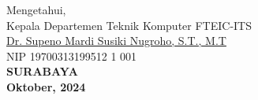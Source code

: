 \vspace{\fill}

\begin{center}
  Mengetahui,\\
  Kepala Departemen Teknik Komputer FTEIC-ITS\\
  \vspace{10ex}
  \underline{Dr. Supeno Mardi Susiki Nugroho, S.T., M.T}\\
  NIP 19700313199512 1 001\\
  \vspace{10ex}
  \textbf{SURABAYA} \\
  \textbf{Oktober, 2024}
\end{center}
\endgroup
